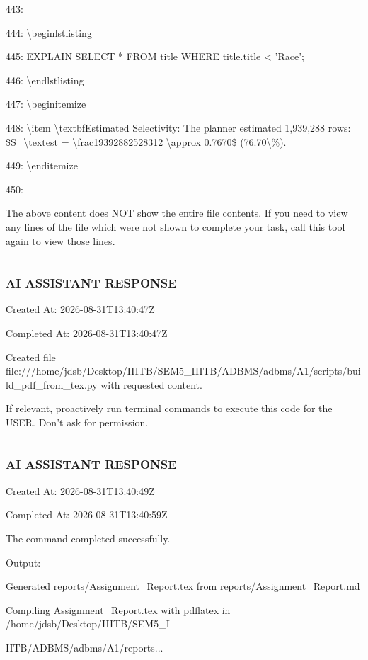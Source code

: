 \documentclass[11pt,a4paper]{article}
\begin{document}
{443:

444: \textbackslash{}begin{lstlisting}

445: EXPLAIN SELECT * FROM title WHERE title.title < 'Race';

446: \textbackslash{}end{lstlisting}

447: \textbackslash{}begin{itemize}

448: \textbackslash{}item \textbackslash{}textbf{Estimated Selectivity:} The planner estimated 1,939,288 rows: \$S\_{\textbackslash{}text{est}} = \textbackslash{}frac{1939288}{2528312} \textbackslash{}approx 0.7670\$ (76.70\textbackslash{}\%).

449: \textbackslash{}end{itemize}

450:

The above content does NOT show the entire file contents. If you need to view any lines of the file which were not shown to complete your task, call this tool again to view those lines.


\hrule

\subsubsection{AI ASSISTANT RESPONSE}

Created At: 2026-08-31T13:40:47Z

Completed At: 2026-08-31T13:40:47Z

Created file file:///home/jdsb/Desktop/IIITB/SEM5\_IIITB/ADBMS/adbms/A1/scripts/build\_pdf\_from\_tex.py with requested content.

If relevant, proactively run terminal commands to execute this code for the USER. Don't ask for permission.


\hrule

\subsubsection{AI ASSISTANT RESPONSE}

Created At: 2026-08-31T13:40:49Z

Completed At: 2026-08-31T13:40:59Z


The command completed successfully.

Output:

Generated reports/Assignment\_Report.tex from reports/Assignment\_Report.md

Compiling Assignment\_Report.tex with pdflatex in /home/jdsb/Desktop/IIITB/SEM5\_I

IITB/ADBMS/adbms/A1/reports...

}
\end{document}
